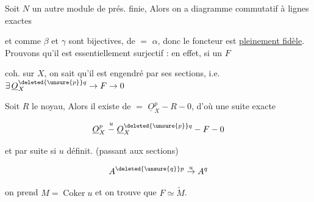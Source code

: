 Soit $N$ un autre module de prés. finie, Alors on a diagramme commutatif à lignes exactes


et comme $\beta$ et $\gamma$ sont bijectives, de $=$ $\alpha$, donc le foncteur  est \uline{pleinement fidèle}. Prouvons qu'il est essentiellement surjectif : en effet, si un $F$

coh. sur $X$, on sait qu'il est engendré par ses sections, i.e. $\exists\,\underline O_X^{\deleted{\unsure{p}}q}\to F\to0$  

Soit $R$ le noyau, Alors il existe de $=$ $\underline O_X^p - R - 0$, d'où une suite exacte

\[
 \underline O_X^{p}\mathrel{\overset{u}{-}}\underline O_X^{\deleted{\unsure{p}}q} - F - 0
\]

et par suite   si $u$ définit. (passant aux sections)

\[
 A^{\deleted{\unsure{q}}p}\mathrel{\overset{u}{\to}}A^q
\]

on prend $M=\operatorname{Coker}u$ et on trouve que $F\simeq\widetilde M$.
